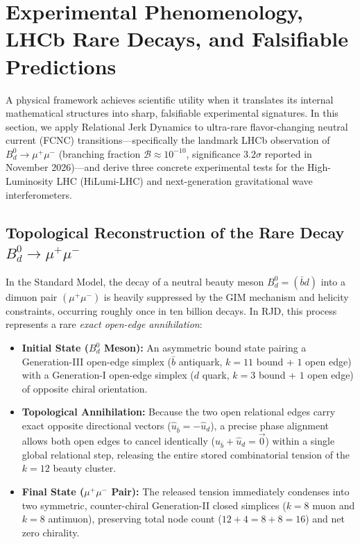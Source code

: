 \documentclass[11pt,a4paper]{article}
\theoremstyle{plain}
\theoremstyle{definition}
\theoremstyle{remark}
\begin{document}
\section{Experimental Phenomenology, LHCb Rare Decays, and Falsifiable Predictions}
\label{sec:phenomenology}

A physical framework achieves scientific utility when it translates its internal mathematical structures into sharp, falsifiable experimental signatures. In this section, we apply Relational Jerk Dynamics to ultra-rare flavor-changing neutral current (FCNC) transitions—specifically the landmark LHCb observation of $B_d^0 \to \mu^+ \mu^-$ (branching fraction $\mathcal{B} \approx 10^{-10}$, significance $3.2\sigma$ reported in November 2026)—and derive three concrete experimental tests for the High-Luminosity LHC (HiLumi-LHC) and next-generation gravitational wave interferometers.

\subsection{Topological Reconstruction of the Rare Decay $B_d^0 \to \mu^+ \mu^-$}
In the Standard Model, the decay of a neutral beauty meson $B_d^0 = (\bar{b}d)$ into a dimuon pair $(\mu^+\mu^-)$ is heavily suppressed by the GIM mechanism and helicity constraints, occurring roughly once in ten billion decays. In RJD, this process represents a rare \emph{exact open-edge annihilation}:
\begin{itemize}
    \item \textbf{Initial State ($B_d^0$ Meson):} An asymmetric bound state pairing a Generation-III open-edge simplex ($\bar{b}$ antiquark, $k=11$ bound + $1$ open edge) with a Generation-I open-edge simplex ($d$ quark, $k=3$ bound + $1$ open edge) of opposite chiral orientation.
    \item \textbf{Topological Annihilation:} Because the two open relational edges carry exact opposite directional vectors ($\hat{u}_{\bar{b}} = -\hat{u}_d$), a precise phase alignment allows both open edges to cancel identically ($\hat{u}_{\bar{b}} + \hat{u}_d = \vec{0}$) within a single global relational step, releasing the entire stored combinatorial tension of the $k=12$ beauty cluster.
    \item \textbf{Final State ($\mu^+ \mu^-$ Pair):} The released tension immediately condenses into two symmetric, counter-chiral Generation-II closed simplices ($k=8$ muon and $k=8$ antimuon), preserving total node count ($12 + 4 = 8 + 8 = 16$) and net zero chirality.
\end{itemize}
\end{document}
